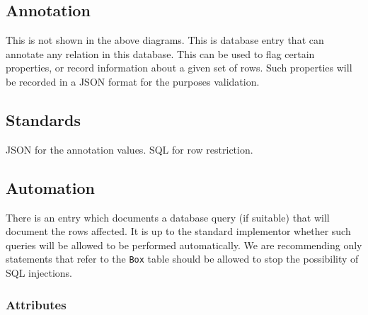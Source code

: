 \documentclass[
]{article}
\begin{document}
\subsection{Annotation}\label{annotation}

This is not shown in the above diagrams. This is database entry that can
annotate any relation in this database. This can be used to flag certain
properties, or record information about a given set of rows. Such
properties will be recorded in a JSON format for the purposes
validation.

\subsection{Standards}\label{standards}

JSON for the annotation values. SQL for row restriction.

\subsection{Automation}\label{automation}

There is an entry which documents a database query (if suitable) that
will document the rows affected. It is up to the standard implementor
whether such queries will be allowed to be performed automatically. We
are recommending only statements that refer to the \texttt{Box} table
should be allowed to stop the possibility of SQL injections.

\subsubsection{Attributes}\label{attributes-1}
\end{document}
